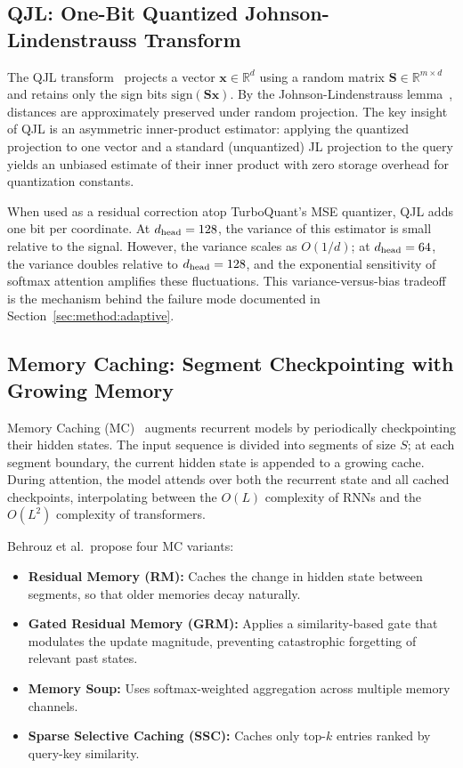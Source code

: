 \subsection{QJL: One-Bit Quantized Johnson-Lindenstrauss Transform}
\label{sec:bg:qjl}

The QJL transform~\cite{zandieh2024qjl} projects a vector
$\mathbf{x} \in \mathbb{R}^d$ using a random matrix
$\mathbf{S} \in \mathbb{R}^{m \times d}$ and retains only the sign
bits $\mathrm{sign}(\mathbf{S}\mathbf{x})$.
By the Johnson-Lindenstrauss lemma~\cite{johnson1984extensions},
distances are approximately preserved under random projection.
The key insight of QJL is an asymmetric inner-product estimator:
applying the quantized projection to one vector and a standard
(unquantized) JL projection to the query yields an unbiased estimate
of their inner product with zero storage overhead for quantization
constants.

When used as a residual correction atop TurboQuant's MSE quantizer,
QJL adds one bit per coordinate.
At $d_{\text{head}} = 128$, the variance of this estimator is small relative to
the signal.
However, the variance scales as $O(1/d)$; at $d_{\text{head}} = 64$, the
variance doubles relative to $d_{\text{head}} = 128$, and the exponential
sensitivity of softmax attention amplifies these fluctuations.
This variance-versus-bias tradeoff is the mechanism behind the failure
mode documented in Section~\ref{sec:method:adaptive}.

\subsection{Memory Caching: Segment Checkpointing with Growing Memory}
\label{sec:bg:mc}

Memory Caching (MC)~\cite{behrouz2026mc} augments recurrent models by
periodically checkpointing their hidden states.
The input sequence is divided into segments of size $S$; at each segment
boundary, the current hidden state is appended to a growing cache.
During attention, the model attends over both the recurrent state and
all cached checkpoints, interpolating between the $O(L)$ complexity of
RNNs and the $O(L^2)$ complexity of transformers.

Behrouz et al.\ propose four MC variants:
\begin{itemize}[noitemsep,topsep=1pt,parsep=0pt,partopsep=0pt]
\item \textbf{Residual Memory (RM):} Caches the change in hidden state
  between segments, so that older memories decay naturally.
\item \textbf{Gated Residual Memory (GRM):} Applies a similarity-based
  gate that modulates the update magnitude, preventing catastrophic
  forgetting of relevant past states.
\item \textbf{Memory Soup:} Uses softmax-weighted aggregation across
  multiple memory channels.
\item \textbf{Sparse Selective Caching (SSC):} Caches only top-$k$
  entries ranked by query-key similarity.
\end{itemize}

